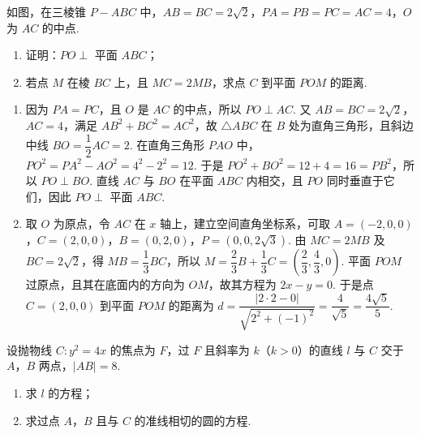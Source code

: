 \begin{problem}
如图，在三棱锥 \(P-ABC\) 中，\(AB=BC=2\sqrt2\)，\(PA=PB=PC=AC=4\)，\(O\) 为 \(AC\) 的中点.

\begin{enumerate}
    \item 证明：\(PO\perp\) 平面 \(ABC\)；
    \item 若点 \(M\) 在棱 \(BC\) 上，且 \(MC=2MB\)，求点 \(C\) 到平面 \(POM\) 的距离.
\end{enumerate}

\end{problem}

\begin{solution}
\begin{enumerate}
\item 因为 \(PA=PC\)，且 \(O\) 是 \(AC\) 的中点，所以 \(PO\perp AC\). 又 \(AB=BC=2\sqrt2\)，\(AC=4\)，满足 \(AB^2+BC^2=AC^2\)，故 \(\triangle ABC\) 在 \(B\) 处为直角三角形，且斜边中线 \(BO=\dfrac12AC=2\). 在直角三角形 \(PAO\) 中，\(PO^2=PA^2-AO^2=4^2-2^2=12\). 于是 \(PO^2+BO^2=12+4=16=PB^2\)，所以 \(PO\perp BO\). 直线 \(AC\) 与 \(BO\) 在平面 \(ABC\) 内相交，且 \(PO\) 同时垂直于它们，因此 \(PO\perp\) 平面 \(ABC\).
\item 取 \(O\) 为原点，令 \(AC\) 在 \(x\) 轴上，建立空间直角坐标系，可取 \(A=(-2,0,0)\)，\(C=(2,0,0)\)，\(B=(0,2,0)\)，\(P=(0,0,2\sqrt3)\). 由 \(MC=2MB\) 及 \(BC=2\sqrt2\)，得 \(MB=\dfrac13BC\)，所以 \(M=\dfrac23B+\dfrac13C=\left(\dfrac23,\dfrac43,0\right)\). 平面 \(POM\) 过原点，且其在底面内的方向为 \(OM\)，故其方程为 \(2x-y=0\). 于是点 \(C=(2,0,0)\) 到平面 \(POM\) 的距离为
\(d=\dfrac{\lvert2\cdot2-0\rvert}{\sqrt{2^2+(-1)^2}}=\dfrac4{\sqrt5}=\dfrac{4\sqrt5}{5}\).
\end{enumerate}
\end{solution}

\begin{problem}
设抛物线 \(C:y^2=4x\) 的焦点为 \(F\)，过 \(F\) 且斜率为 \(k\)（\(k>0\)）的直线 \(l\) 与 \(C\) 交于 \(A\)，\(B\) 两点，\(\lvert AB\rvert=8\).

\begin{enumerate}
    \item 求 \(l\) 的方程；
    \item 求过点 \(A\)，\(B\) 且与 \(C\) 的准线相切的圆的方程.
\end{enumerate}
\end{problem}

